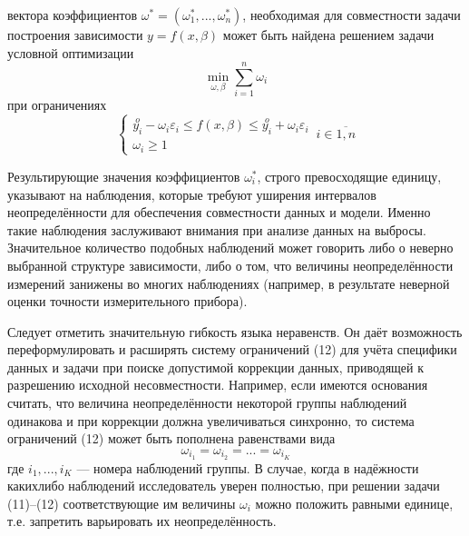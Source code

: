 \documentclass[a4paper,14pt]{article}
\begin{document}
	вектора коэффициентов $\omega^* = (\omega_1^*,...,\omega_n^*)$, необходимая для совместности задачи построения зависимости $y = f(x, \beta)$ может быть найдена решением задачи условной оптимизации
	\begin{equation}
		\min_{\omega, \beta} \sum_{i=1}^{n} \omega_i
	\end{equation}
	при ограничениях
	\begin{equation}
		\begin{cases}
			\stackrel{o}{y_i} - \omega_i\varepsilon_i \leq f(x, \beta) \leq \stackrel{o}{y_i} + \omega_i\varepsilon_i\\
			\omega_i \geq 1
		\end{cases}\, i \in \overline{1,n}
	\end{equation}
	
	Результирующие значения коэффициентов $\omega_i^*$, строго превосходящие единицу, указывают на наблюдения, которые требуют уширения интервалов неопределённости для обеспечения совместности данных и модели. Именно такие наблюдения заслуживают внимания при анализе данных на выбросы. Значительное количество подобных наблюдений может говорить либо о неверно выбранной структуре зависимости, либо о том, что величины неопределённости измерений занижены во многих наблюдениях (например, в результате неверной оценки точности измерительного прибора).
	
	Следует отметить значительную гибкость языка неравенств. Он даёт возможность переформулировать и расширять систему ограничений (12) для учёта специфики данных и задачи при поиске допустимой коррекции данных, приводящей к разрешению исходной несовместности. Например, если имеются основания считать, что величина неопределённости некоторой группы наблюдений одинакова и при коррекции должна увеличиваться синхронно, то система ограничений (12) может быть пополнена равенствами вида
	\begin{equation*}
		\omega_{i_1} = \omega_{i_2} = ... = \omega_{i_K}
	\end{equation*}
	где $i_1, ..., i_K$ — номера наблюдений группы. В случае, когда в надёжности какихлибо наблюдений исследователь уверен полностью, при решении задачи (11)–(12) соответствующие им величины $\omega_i$ можно положить равными единице, т.е. запретить варьировать их неопределённость.
	
\end{document}
